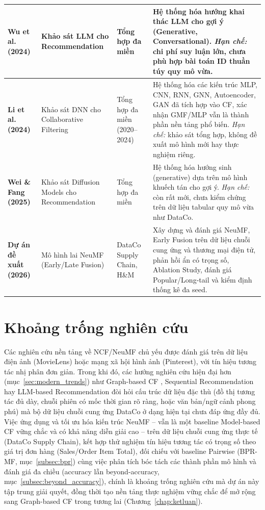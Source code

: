\begin{xltabular}{\textwidth}{|p{3.2cm}|p{2.8cm}|p{2.5cm}|X|}
    \hline
    \textbf{Wu et al. (2024)} \cite{wu2023survey_llm4rec} & Khảo sát LLM cho Recommendation & Tổng hợp đa miền & Hệ thống hóa hướng khai thác LLM cho gợi ý (Generative, Conversational). \textit{Hạn chế:} chi phí suy luận lớn, chưa phù hợp bài toán ID thuần túy quy mô vừa. \\
    \hline
    \textbf{Li et al. (2024)} \cite{li2024dnncf} & Khảo sát DNN cho Collaborative Filtering & Tổng hợp đa miền (2020--2024) & Hệ thống hóa các kiến trúc MLP, CNN, RNN, GNN, Autoencoder, GAN đã tích hợp vào CF, xác nhận GMF/MLP vẫn là thành phần nền tảng phổ biến. \textit{Hạn chế:} khảo sát tổng hợp, không đề xuất mô hình mới hay thực nghiệm riêng. \\
    \hline
    \textbf{Wei \& Fang (2025)} \cite{wei2025diffusion} & Khảo sát Diffusion Models cho Recommendation & Tổng hợp đa miền & Hệ thống hóa hướng sinh (generative) dựa trên mô hình khuếch tán cho gợi ý. \textit{Hạn chế:} còn rất mới, chưa kiểm chứng trên dữ liệu tabular quy mô vừa như DataCo. \\
    \hline
    \textbf{Dự án đề xuất (2026)} & Mô hình lai NeuMF (Early/Late Fusion) & DataCo Supply Chain, H\&M & Xây dựng và đánh giá NeuMF, Early Fusion trên dữ liệu chuỗi cung ứng và thương mại điện tử, phản hồi ẩn có trọng số, Ablation Study, đánh giá Popular/Long-tail và kiểm định thống kê đa seed. \\
    \hline
\end{xltabular}

\section{Khoảng trống nghiên cứu}
\label{sec:khoangtrong_nghiencuu}

Các nghiên cứu nền tảng về NCF/NeuMF \parencite{he2017ncf} chủ yếu được đánh giá trên dữ liệu điện ảnh (MovieLens) hoặc mạng xã hội hình ảnh (Pinterest), với tín hiệu tương tác nhị phân đơn giản. Trong khi đó, các hướng nghiên cứu hiện đại hơn (mục~\ref{sec:modern_trends}) như Graph-based CF \parencite{wang2019ngcf, he2020lightgcn}, Sequential Recommendation \parencite{kang2018self, sun2019bert4rec} hay LLM-based Recommendation \parencite{wu2023survey_llm4rec, rajput2023tiger} đòi hỏi cấu trúc dữ liệu đặc thù (đồ thị tương tác đủ dày, chuỗi phiên có mốc thời gian rõ ràng, hoặc văn bản/ngữ cảnh phong phú) mà bộ dữ liệu chuỗi cung ứng DataCo ở dạng hiện tại chưa đáp ứng đầy đủ. Việc ứng dụng và tối ưu hóa kiến trúc NeuMF -- vẫn là một baseline Model-based CF vững chắc và có khả năng diễn giải cao -- trên dữ liệu chuỗi cung ứng thực tế (DataCo Supply Chain), kết hợp thử nghiệm tín hiệu tương tác có trọng số theo giá trị đơn hàng (Sales/Order Item Total), đối chiếu với baseline Pairwise (BPR-MF, mục~\ref{subsec:bpr}) cùng việc phân tích bóc tách các thành phần mô hình và đánh giá đa chiều (accuracy lẫn beyond-accuracy, mục~\ref{subsec:beyond_accuracy}), chính là khoảng trống nghiên cứu mà dự án này tập trung giải quyết, đồng thời tạo nền tảng thực nghiệm vững chắc để mở rộng sang Graph-based CF trong tương lai (Chương~\ref{chap:ketluan}).